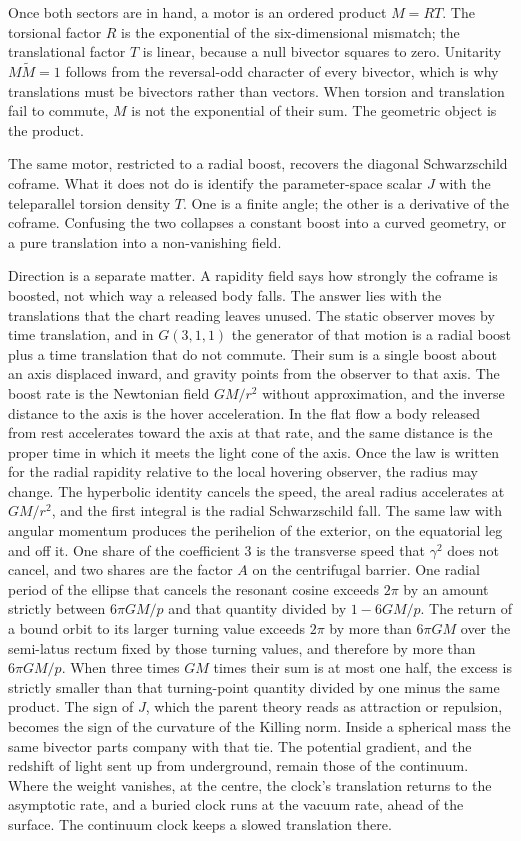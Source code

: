 \documentclass[a4paper]{article}
\begin{document}
Once both sectors are in hand, a motor is an ordered product \(M=RT\). The torsional factor \(R\) is the exponential of the six-dimensional mismatch; the translational factor \(T\) is linear, because a null bivector squares to zero. Unitarity \(M\widetilde{M}=1\) follows from the reversal-odd character of every bivector, which is why translations must be bivectors rather than vectors. When torsion and translation fail to commute, \(M\) is not the exponential of their sum. The geometric object is the product.

The same motor, restricted to a radial boost, recovers the diagonal Schwarzschild coframe. What it does not do is identify the parameter-space scalar \(J\) with the teleparallel torsion density \(T\). One is a finite angle; the other is a derivative of the coframe. Confusing the two collapses a constant boost into a curved geometry, or a pure translation into a non-vanishing field.

Direction is a separate matter. A rapidity field says how strongly the coframe is boosted, not which way a released body falls. The answer lies with the translations that the chart reading leaves unused. The static observer moves by time translation, and in \(G(3,1,1)\) the generator of that motion is a radial boost plus a time translation that do not commute. Their sum is a single boost about an axis displaced inward, and gravity points from the observer to that axis. The boost rate is the Newtonian field \(GM/r^{2}\) without approximation, and the inverse distance to the axis is the hover acceleration. In the flat flow a body released from rest accelerates toward the axis at that rate, and the same distance is the proper time in which it meets the light cone of the axis. Once the law is written for the radial rapidity relative to the local hovering observer, the radius may change. The hyperbolic identity cancels the speed, the areal radius accelerates at \(GM/r^{2}\), and the first integral is the radial Schwarzschild fall. The same law with angular momentum produces the perihelion of the exterior, on the equatorial leg and off it. One share of the coefficient \(3\) is the transverse speed that \(\gamma^{2}\) does not cancel, and two shares are the factor \(A\) on the centrifugal barrier. One radial period of the ellipse that cancels the resonant cosine exceeds \(2\pi\) by an amount strictly between \(6\pi GM/p\) and that quantity divided by \(1-6GM/p\). The return of a bound orbit to its larger turning value exceeds \(2\pi\) by more than \(6\pi GM\) over the semi-latus rectum fixed by those turning values, and therefore by more than \(6\pi GM/p\). When three times \(GM\) times their sum is at most one half, the excess is strictly smaller than that turning-point quantity divided by one minus the same product. The sign of \(J\), which the parent theory reads as attraction or repulsion, becomes the sign of the curvature of the Killing norm. Inside a spherical mass the same bivector parts company with that tie. The potential gradient, and the redshift of light sent up from underground, remain those of the continuum. Where the weight vanishes, at the centre, the clock's translation returns to the asymptotic rate, and a buried clock runs at the vacuum rate, ahead of the surface. The continuum clock keeps a slowed translation there.
\end{document}

